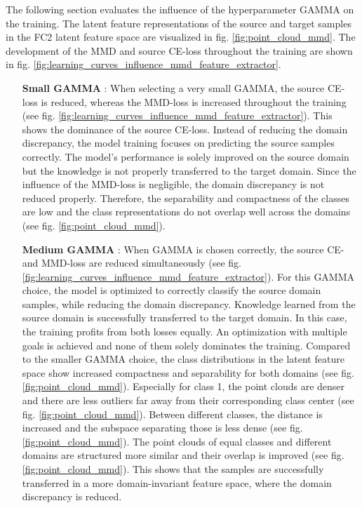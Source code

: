 The following section evaluates the influence of the hyperparameter GAMMA on the training. The latent feature representations of the source and target samples in the FC2 latent feature space are visualized in fig. \ref{fig:point_cloud_mmd}. The development of the MMD and source CE-loss throughout the training are shown in fig. \ref{fig:learning_curves_influence_mmd_feature_extractor}.
\begin{itemize}
    \item [\textbf{Small GAMMA}]:
    When selecting a very small GAMMA, the source CE-loss is reduced, whereas the MMD-loss is increased throughout the training (see fig. \ref{fig:learning_curves_influence_mmd_feature_extractor}). This shows the dominance of the source CE-loss. Instead of reducing the domain discrepancy, the model training focuses on predicting the source samples correctly. The model's performance is solely improved on the source domain but the knowledge is not properly transferred to the target domain. Since the influence of the MMD-loss is negligible, the domain discrepancy is not reduced properly. Therefore, the separability and compactness of the classes are low and the class representations do not overlap well across the domains (see fig. \ref{fig:point_cloud_mmd}).
    \item [\textbf{Medium GAMMA}]:
    When GAMMA is chosen correctly, the source CE- and MMD-loss are reduced simultaneously (see fig. \ref{fig:learning_curves_influence_mmd_feature_extractor}). For this GAMMA choice, the model is optimized to correctly classify the source domain samples, while reducing the domain discrepancy. Knowledge learned from the source domain is successfully transferred to the target domain. In this case, the training profits from both losses equally. An optimization with multiple goals is achieved and none of them solely dominates the training. Compared to the smaller GAMMA choice, the class distributions in the latent feature space show increased compactness and separability for both domains (see fig. \ref{fig:point_cloud_mmd}). Especially for class 1, the point clouds are denser and there are less outliers far away from their corresponding class center (see fig. \ref{fig:point_cloud_mmd}). Between different classes, the distance is increased and the subspace separating those is less dense (see fig. \ref{fig:point_cloud_mmd}). The point clouds of equal classes and different domains are structured more similar and their overlap is improved (see fig. \ref{fig:point_cloud_mmd}). This shows that the samples are successfully transferred in a more domain-invariant feature space, where the domain discrepancy is reduced.

\end{itemize}
